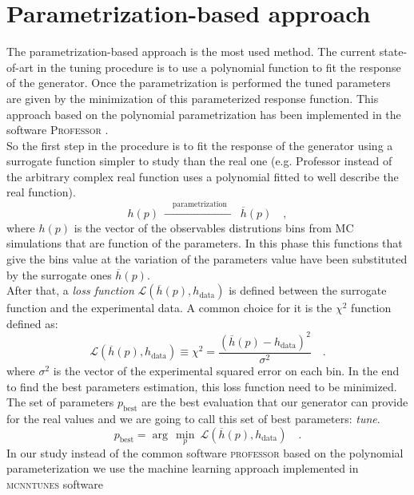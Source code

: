 \section{Parametrization-based approach}

The parametrization-based approach is the most used method. The current state-of-art in the tuning procedure is to use a polynomial function to fit the response of the generator. Once the parametrization is performed the tuned parameters are given by the minimization of this parameterized response function. This approach based on the polynomial parametrization has been  implemented in the software \textsc{Professor} \cite{Buckley:2009bj}. 
\\
So the first step in the procedure is to fit the response of the generator using a surrogate function simpler to study than the real one (e.g. Professor instead of the arbitrary complex real function uses a polynomial fitted to well describe the real function).
\begin{equation}
	h(p)\ \xrightarrow{\quad \text{parametrization}\quad }\ \overline{h}(p)\quad ,
\end{equation}
where $h(p)$ is the vector of the observables distrutions bins from MC simulations that are function of the parameters. In this phase this functions that give the bins value at the variation of the parameters value have been substituted by the surrogate ones $\overline{h}(p)$.  
\\
After that, a \textit{loss function} $\mathcal{L}(\overline{h}(p),h_{\text{data}})$ is defined between the surrogate function and the experimental data. A common choice for it is the $\chi^2$ function defined as:
\begin{equation}
	\mathcal{L}(\overline{h}(p),h_{\text{data}})\equiv \chi^2=\frac{(\overline{h}(p)-h_{\text{data}})^2}{\sigma^2}\quad.
\end{equation}
where $\sigma^2$ is the vector of the experimental squared error on each bin.  
In the end to find the best parameters estimation, this loss function need to be minimized. The set of parameters $p_{\text{best}}$ are the best evaluation that our generator can provide for the real values and we are going to call this set of best parameters: \textit{tune}.
\begin{equation}
	p_{\text{best}}=\arg\,\min_p\ \mathcal{L}(\overline{h}(p),h_{\text{data}})\quad.
\end{equation}
In our study instead of the common software \textsc{professor} based on the polynomial parameterization we use the machine learning approach implemented in \textsc{mcnntunes} software \cite{MCNNTUNESonGitHub}
